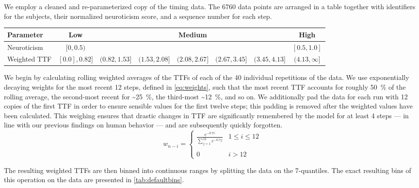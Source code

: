 We employ a cleaned and re-parameterized copy of the timing data.
The \num{6760} data points are arranged in a table together with identifiers for the subjects, their normalized neuroticism score, and a sequence number for each step.

\begin{table*}[]
    \centering
    \caption{%
        Default bins used for model parameter levels.
        Values have been rounded to two decimal places.
    }
    \label{tab:defaultbins}
    \begin{tabular}{@{}lccccccc@{}}
        \toprule
        \textbf{Parameter} & \textbf{Low} & & & \textbf{Medium} & & & \textbf{High}         \\ \midrule
        Neuroticism        & \( [0, 0.5) \) & & & & & & \( [0.5, 1.0] \)      \\
        Weighted TTF & \([0.0], 0.82]\) & \((0.82, 1.53]\) & \((1.53, 2.08]\) & \((2.08, 2.67]\) & \((2.67, 3.45]\) & \((3.45, 4.13]\) & \((4.13, \infty]\)
    \end{tabular}
\end{table*}

We begin by calculating rolling weighted averages of the \glspl{TTF} of each of the \num{40} individual repetitions of the data.
We use exponentially decaying weights for the most recent \num{12} steps, defined in \cref{eq:weights}, such that the most recent \gls{TTF} accounts for roughly \SI{50}{\percent} of the rolling average, the second-most recent for \textasciitilde\SI{25}{\percent}, the third-most \textasciitilde\SI{12}{\percent}, and so on.
We additionally pad the data for each run with \num{12} copies of the first \gls{TTF} in order to ensure sensible values for the first twelve steps; this padding is removed after the weighted values have been calculated.
This weighing ensures that drastic changes in \gls{TTF} are significantly remembered by the model for at least \num{4} steps --- in line with our previous findings on human behavior --- and are subsequently quickly forgotten.
\begin{equation}\label{eq:weights}
    w_{n - i} = 
    \left\{ \begin{array}{ll}
        \frac{e^{-0.7 i}}{\sum\limits^{12}_{j=1} e^{-0.7 j}} & 1 \leq i \leq 12 \\
        & \\
        0 & i > 12
    \end{array} \right.
\end{equation}

The resulting weighted \glspl{TTF} are then binned into continuous ranges by splitting the data on the \num{7}-quantiles.
The exact resulting bins of this operation on the data are presented in \cref{tab:defaultbins}.

